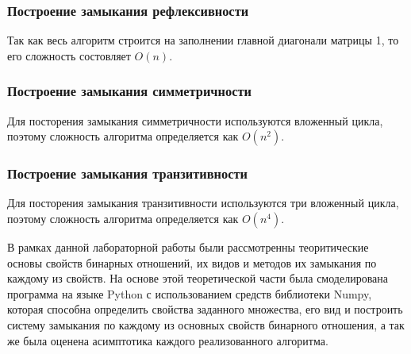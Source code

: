 \documentclass[spec, och, labwork]{shiza}
\begin{document}
        \subsubsection{Построение замыкания рефлексивности}
        
            Так как весь алгоритм строится на заполнении главной диагонали матрицы 1, то его сложность состовляет $O(n)$.

        \subsubsection{Построение замыкания симметричности}

            Для посторения замыкания симметричности используются вложенный цикла, поэтому сложность алгоритма
            определяется как $O(n^2)$.

        \subsubsection{Построение замыкания транзитивности}

            Для посторения замыкания транзитивности используются три вложенный цикла, поэтому сложность алгоритма
            определяется как $O(n^4)$.
    
\conclusion

В рамках данной лабораторной работы были рассмотренны теоритические основы свойств бинарных отношений, их видов и методов
их замыкания по каждому из свойств. На основе этой теоретической части была смоделирована программа на языке Python с 
использованием средств библиотеки Numpy, которая способна определить свойства заданного множества, его вид и построить 
систему замыкания по каждому из основных свойств бинарного отношения, а так же была оценена асимптотика каждого реализованного
алгоритма.
\end{document}
